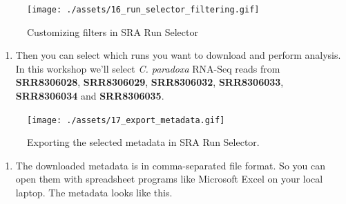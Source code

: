 \documentclass[
  letterpaper,
  DIV=11,
  numbers=noendperiod]{scrreprt}
\providecommand{\tightlist}{%
  \setlength{\itemsep}{0pt}\setlength{\parskip}{0pt}}\usepackage{longtable,booktabs,array}
\begin{document}
\begin{tcolorbox}
\begin{figure}[H]
{\centering \texttt{[image: ./assets/16\_run\_selector\_filtering.gif]}

}

\caption{Customizing filters in SRA Run Selector}

\end{figure}

\begin{enumerate}
\def\labelenumi{\arabic{enumi}.}
\setcounter{enumi}{3}
\tightlist
\item
  Then you can select which runs you want to download and perform
  analysis. In this workshop we'll select \emph{C. paradoxa} RNA-Seq
  reads from \textbf{SRR8306028}, \textbf{SRR8306029},
  \textbf{SRR8306032}, \textbf{SRR8306033}, \textbf{SRR8306034} and
  \textbf{SRR8306035}.
\end{enumerate}

\begin{figure}[H]

{\centering \texttt{[image: ./assets/17\_export\_metadata.gif]}

}

\caption{Exporting the selected metadata in SRA Run Selector.}

\end{figure}

\begin{enumerate}
\def\labelenumi{\arabic{enumi}.}
\setcounter{enumi}{4}
\tightlist
\item
  The downloaded metadata is in comma-separated file format. So you can
  open them with spreadsheet programs like Microsoft Excel on your local
  laptop. The metadata looks like this.
\end{enumerate}

\begin{table}
\centering\begingroup\fontsize{11}{13}\selectfont


\end{table}
\end{tcolorbox}
\end{document}
